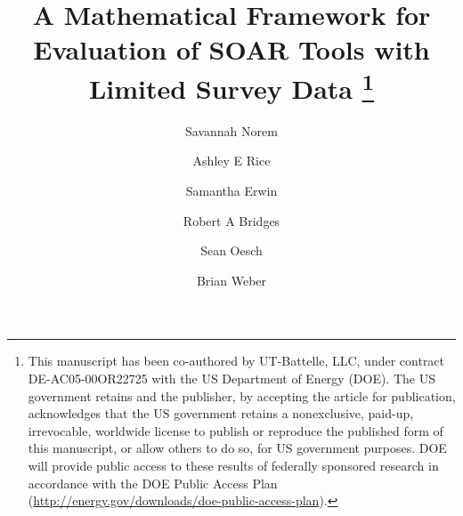 \title{A Mathematical Framework for Evaluation of SOAR Tools with Limited Survey Data
\thanks{\scriptsize{This manuscript has been co-authored by UT-Battelle, LLC, under contract DE-AC05-00OR22725 with the US Department of Energy (DOE). The US government retains and the publisher, by accepting the article for publication, acknowledges that the US government retains a nonexclusive, paid-up, irrevocable, worldwide license to publish or reproduce the published form of this manuscript, or allow others to do so, for US government purposes. DOE will provide public access to these results of federally sponsored research in accordance with the DOE Public Access Plan (\url{http://energy.gov/downloads/doe-public-access-plan}).}}
} %
\author{Savannah Norem \and
Ashley E Rice  \and 
Samantha Erwin \and
Robert A Bridges  \and 
Sean Oesch  \and
Brian Weber }
